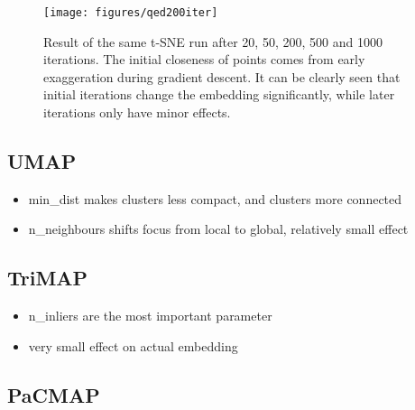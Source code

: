 \begin{figure}[!h]
	\centering
	\texttt{[image: figures/qed200iter]}
	\caption{Result of the same t-SNE run after 20, 50, 200, 500 and 1000 iterations. The initial closeness of points comes from early exaggeration during gradient descent. It can be clearly seen that initial iterations change the embedding significantly, while later iterations only have minor effects.}
	\label{fig:tsne:iter_sweep}
\end{figure}





\subsection{UMAP}

\begin{itemize}
	\item min\_dist makes clusters less compact, and clusters more connected
	\item n\_neighbours shifts focus from local to global, relatively small effect
\end{itemize}

\subsection{TriMAP}

\begin{itemize}
	\item n\_inliers are the most important parameter
	\item very small effect on actual embedding
\end{itemize}

\subsection{PaCMAP}

